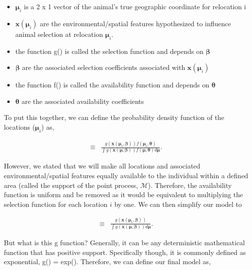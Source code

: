 \documentclass[12pt]{article}
\begin{document}
\begin{itemize}
\item $\boldsymbol{\mu}_{i}$ is a 2 x 1 vector of the animal's true geographic coordinate for relocation i
\item $\textbf{x}(\boldsymbol{\mu}_{i})$ are the environmental/spatial features hypothesized to influence animal selection at relocation $\boldsymbol{\mu}_{i}$.
\item the function g() is called the selection function and depends on $\boldsymbol{\beta}$
\item  $\boldsymbol{\beta}$ are the associated selection coefficients associated with $\textbf{x}(\boldsymbol{\mu}_{i})$
\item the function f() is called the availability function and depends on $\boldsymbol{\theta}$
\item  $\boldsymbol{\theta}$ are the associated availability coefficients 
\end{itemize}

To put this together, we can define the probability density function of the locations ($\boldsymbol{\mu}_{i}$) as,


\begin{align*}
[\boldsymbol{\mu}_{i}| \boldsymbol{\beta}, \boldsymbol{\theta}] \equiv &  \frac{g(\textbf{x}(\boldsymbol{\mu}_{i}, \boldsymbol{\beta}))f(\boldsymbol{\mu}_{i},\boldsymbol{\theta})}{\int g(\textbf{x}(\boldsymbol{\mu}, \boldsymbol{\beta}))f(\boldsymbol{\mu},\boldsymbol{\theta})d\boldsymbol{\mu}}.
\end{align*}

However, we stated that we will make all locations and associated environmental/spatial features equally available to the individual within a defined area (called the support of the point process, $\mathcal{M}$). Therefore, the availability function is uniform and be removed as it would be equivalent to multiplying the selection function for each location $i$ by one. We can then simplify our model to


\begin{align*}
[\boldsymbol{\mu}_{i}| \boldsymbol{\beta}] \equiv &  \frac{g(\textbf{x}(\boldsymbol{\mu}_{i}, \boldsymbol{\beta}))}{\int g(\textbf{x}(\boldsymbol{\mu}, \boldsymbol{\beta}))d\boldsymbol{\mu}}.
\end{align*}

But what is this g function? Generally, it can be any deterministic mathematical function that has positive support. Specifically though, it is commonly defined as exponential, g() = exp(). Therefore, we can define our final model as,
\end{document}
